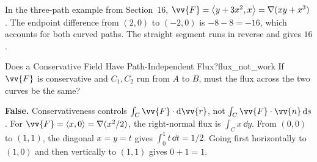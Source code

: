 In the three-path example from Section~16, $\vv{F} = \ang{y + 3x^2,x} = \nabla(xy + x^3)$. The endpoint difference from $(2,0)$ to $(-2,0)$ is $-8 - 8 = -16$, which accounts for both curved paths. The straight segment runs in reverse and gives $16$.

\begin{problem}{Does a Conservative Field Have Path-Independent Flux?}{flux_not_work}
If $\vv{F}$ is conservative and $C_1,C_2$ run from $A$ to $B$, must the flux across the two curves be the same?
\end{problem}
\begin{sol}
\textbf{False.} Conservativeness controls $\int_C\vv{F}\cdot\dd{\vv{r}}$, not $\int_C\vv{F}\cdot\vv{n}\,\dd{s}$.
For $\vv{F} = \ang{x,0} = \nabla(x^2/2)$, the right-normal flux is $\int_C x\,\dd{y}$. From $(0,0)$ to $(1,1)$, the diagonal $x = y = t$ gives $\int_0^1 t\,\dd{t} = 1/2$. Going first horizontally to $(1,0)$ and then vertically to $(1,1)$ gives $0 + 1 = 1$.
\end{sol}

\newpage
